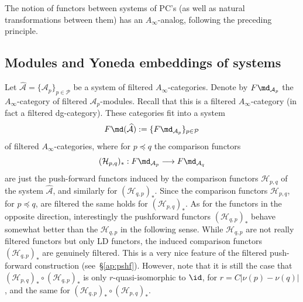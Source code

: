 The notion of functors between systems of PC's (as well as natural
transformations between them) has an $A_{\infty}$-analog, following
the preceding principle.

\subsection{Modules and Yoneda embeddings of
  systems} \label{sbsb:yoneda-sys}

Let $\widehat{\mathcal{A}} = \{\mathcal{A}_p\}_{p \in \mathcal{P}}$ be
a system of filtered $A_{\infty}$-categories. Denote by
$F\md_{\mathcal{A}_p}$ the $A_{\infty}$-category of filtered
$\mathcal{A}_p$-modules. Recall that this is a filtered
$A_{\infty}$-category (in fact a filtered dg-category). These
categories fit into a system
$$F\md(\widehat{\mathcal{A}}) := \{ F\md_{\mathcal{A}_p} \}_{p \in
  \mathcal{P}}$$ of filtered $A_{\infty}$-categories, where for
$p \preceq q$ the comparison functors
$$(\mathcal{H}_{p,q})_* : F\md_{\mathcal{A}_p} \longrightarrow
F\md_{\mathcal{A}_q}$$ are just the push-forward functors induced by
the comparison functors $\mathcal{H}_{p,q}$ of the system
$\widehat{\mathcal{A}}$, and similarly for $(\mathcal{H}_{q,p})_*$.
Since the comparison functors $\mathcal{H}_{p,q}$, for $p \preceq q$,
are filtered the same holds for $(\mathcal{H}_{p,q})_*$. As for the
functors in the opposite direction, interestingly the pushforward
functors $(\mathcal{H}_{q,p})_*$ behave somewhat better than the
$\mathcal{H}_{q,p}$ in the following sense. While $\mathcal{H}_{q,p}$
are not really filtered functors but only LD functors, the induced
comparison functors $(\mathcal{H}_{q,p})_*$ are genuinely
filtered. This is a very nice feature of the filtered push-forward
construction (see~\S\ref{ap:pshf}). However, note that it is still the
case that $(\mathcal{H}_{p,q})_* \circ (\mathcal{H}_{q,p})_*$ is only
$r$-quasi-isomorphic to $\id$, for $r = C | \nu(p) - \nu(q)|$, and the
same for $(\mathcal{H}_{q,p})_* \circ (\mathcal{H}_{p,q})_*$.


